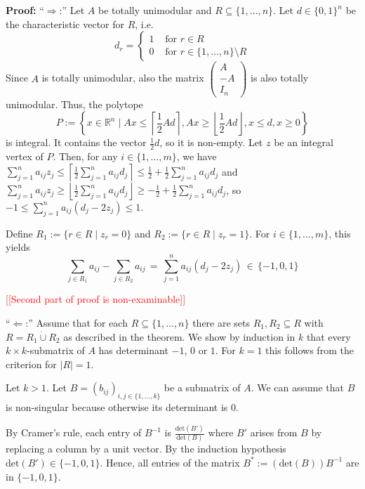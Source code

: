 \documentclass[12pt, showidx, twoside]{article}
\newcommand{\RED}[1]{\textcolor{red}{#1}}
\def\prove{\par \noindent \hbox{\bf Proof:}\quad}
\def\R{\mathbb{R}}
\begin{document}
{{\prove
``$\Rightarrow$:'' Let $A$ be totally unimodular and $R \subseteq \{1,\dots,n\}$.
Let $d \in \{0,1\}^n$ be the characteristic vector for $R$, i.e.\
\[
   d_r = \left\{\begin{array}{ll}
           1 & \text{ for } r \in R\\
           0 & \text{ for } r \in \{1,\dots,n\}\setminus R
         \end{array}
         \right.
\]
Since $A$ is totally unimodular, also the matrix
$\left(\begin{array}{r}
A  \\
-A \\
I_n
\end{array}
\right)$ is also totally unimodular.
Thus, the polytope
\[
   P := \left\{
      x \in \R^n \mid   Ax \leq \left\lceil  \frac{1}{2} Ad \right\rceil, 
                        Ax \geq \left\lfloor \frac{1}{2} Ad \right\rfloor,
                        x \leq d, x \geq 0
   \right\}
\]
is integral. It contains the vector $\frac{1}{2}d$, so it is non-empty.
Let $z$ be an integral vertex of $P$. 
Then, for any $i \in \{1,\dots,m\}$, we have
$\sum_{j=1}^n a_{ij} z_j  \leq  \left\lceil \frac{1}{2} \sum_{j=1}^n a_{ij} d_j \right\rceil
\leq  \frac{1}{2} + \frac{1}{2} \sum_{j=1}^n a_{ij} d_j$ and
$\sum_{j=1}^n a_{ij} z_j  \geq  \left\lfloor \frac{1}{2} \sum_{j=1}^n a_{ij} d_j \right\rfloor
\geq  -\frac{1}{2} + \frac{1}{2} \sum_{j=1}^n a_{ij} d_j$, so
$-1 \leq \sum_{j=1}^n a_{ij} (d_j - 2z_j) \leq  1$.

Define $R_1 := \{r \in R \mid z_r = 0\}$ and $R_2 := \{r \in R \mid z_r = 1\}$.
For $i \in \{1,\dots,m\}$, this yields
\[
   \sum_{j \in R_1} a_{ij} - \sum_{j \in R_2} a_{ij} \, = \, \sum_{j=1}^n  a_{ij} (d_j - 2z_j) \, \in \, \{-1,0,1\}
\]

\RED{[[Second part of proof is non-examinable]]} 

``$\Leftarrow$:'' Assume that for each  $R \subseteq \{1,\dots,n\}$ there are
sets $R_1, R_2 \subseteq R$
with $R = R_1 \dot\cup R_2$ as described in the theorem.
We show by induction in $k$ that every $k \times k$-submatrix of $A$ has determinant $-1$, $0$ or $1$.
For $k = 1$ this follows from the criterion for $|R| = 1$.

Let $k > 1$. Let $B = (b_{ij})_{i,j \in \{1,\dots,k\}}$ be a submatrix of $A$.
We can assume that $B$ is non-singular because otherwise its determinant is $0$.

By Cramer's rule, each entry of $B^{-1}$ is $\frac{\text{det}(B')}{\text{det}(B)}$
where $B'$ arises from $B$ by replacing a column by a unit vector. By the 
induction hypothesis $\text{det}(B') \in \{-1,0,1\}$. 
Hence, all entries of the matrix $B^* := (\text{det}(B))B^{-1}$ are in $\{-1,0,1\}$.

}}
\end{document}
